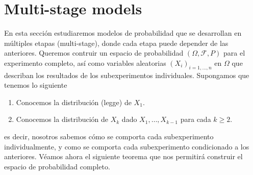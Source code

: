 \section{Multi-stage models}
\noindent
En esta sección estudiaremos modelos de probabilidad que se desarrollan en múltiples etapas (multi-stage), donde cada etapa puede depender de las anteriores. Queremos contruir un espacio de probabilidad $(\Omega, \mathcal{F}, P)$ para el experimento completo, así como variables aleatorias $(X_i)_{i=1, \ldots, n}$ en $\Omega$ que describan los resultados de los subexperimentos individuales. Supongamos que tenemos lo siguiente

\begin{enumerate}[label=\arabic*)]
    \item Conocemos la distribución (legge) de $X_1$.
    \item Conocemos la distribución de $X_k$ dado $X_1, \ldots, X_{k-1}$ para cada $k\geq 2$.
\end{enumerate}
es decir, nosotros sabemos cómo se comporta cada subexperimento individualmente, y como se comporta cada subexperimento condicionado a los anteriores. Véamos ahora el siguiente teorema que nos permitirá construir el espacio de probabilidad completo.

